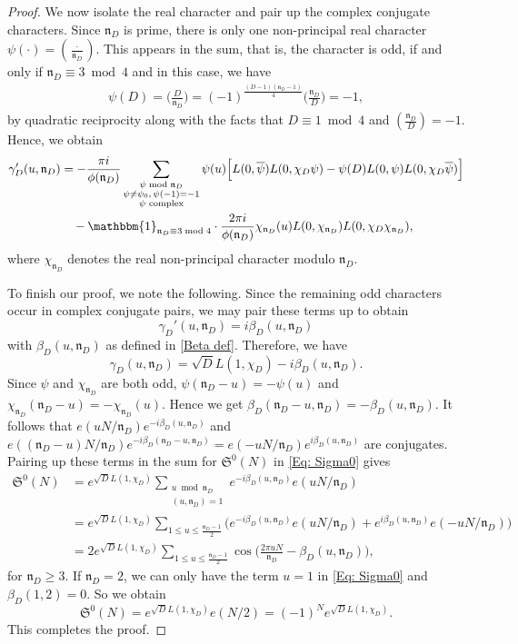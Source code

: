 \documentclass[11pt]{amsart}
\numberwithin{equation}{section}
\newcommand{\mf}{\mathfrak}
\newcommand{\n}{\mf{n}_D}
\theoremstyle{remark}
\begin{document}
\begin{proof}
We now isolate the real character and pair up the complex conjugate characters. Since $\n$ is prime, there is only one non-principal real character $\psi(\cdot)=(\tfrac{\cdot}{\n})$. This appears in the sum, that is, the character is odd, if and only if $\n\equiv 3 \bmod 4$ and in this case, we have 
\begin{align}\label{Eq: Quadratic Reciprocity}
   \psi(D)=\Big(\frac{D}{\n}\Big)=(-1)^{\frac{(D-1)(\n-1)}{4}}\Big(\frac{\n}{D}\Big)
=
-1, 
\end{align}
by quadratic reciprocity along with the facts that $D\equiv 1\bmod 4$ and $(\frac{\n}{D})=-1$. Hence, we obtain 
\begin{align}\label{Eq: Gamma Evaluation III}
\gamma_D'(u,\mf{n}_D)& =
-\frac{\pi i}{\phi(\mf{n}_D)}\sum_{\substack{\psi \bmod \mf{n}_D \\ \psi \neq \psi_0, \,  \psi(-1)=-1 \\ \psi \textrm{ complex}}} \psi(u) \Big[
L(0,\overline{\psi})L(0,\chi_D\psi)-\psi(D) L(0,\psi)L(0,\chi_D\overline{\psi})\Big] \notag \\
&\quad -\mathbbm{1}_{\n \equiv 3\bmod 4} \cdot \frac{2\pi i}{\phi(\mf{n}_D)}\chi_{\n}(u) L(0,\chi_{\n})L(0,\chi_D\chi_{\n}),
\end{align}
where $\chi_{\n}$ denotes the real non-principal character modulo $\n$. 

To finish our proof, we note the following. Since the remaining odd characters occur in complex conjugate pairs, we may pair these terms up to obtain
\[
\gamma_D'(u,\mf{n}_D) = i \beta_D(u,\mf{n}_D)
\]
with $\beta_D(u,\mf{n}_D)$ as defined in \eqref{Beta def}. Therefore, we have 
\[
\gamma_D(u,\mf{n}_D)
=
\sqrt{D}
L(1,\chi_D)
-i \beta_D(u,\mf{n}_D).
\]
Since $\psi$ and $\chi_{\n}$ are both odd, $\psi(\n-u)=-\psi(u)$ and $\chi_{\n}(\n-u) = -\chi_{\n}(u)$. Hence we get $
\beta_D(\n-u,\mf{n}_D)=-\beta_D(u,\mf{n}_D).$ It follows that $e(uN/\n)e^{-i \beta_D(u,\mf{n}_D)}$ and $e((\n-u)N/\n)e^{-i\beta_D(\n-u,\mf{n}_D)}=e(-uN/\n)e^{i\beta_D(u,\mf{n}_D)}$ are conjugates. Pairing up these terms in the sum for $\mf{S}^{0}(N)$ in \eqref{Eq: Sigma0} gives
\begin{align*}
\mf{S}^{0}(N)&=  e^{\sqrt{D}L(1,\chi_D)} \sum_{\substack{u \bmod \mf{n}_D \\ (u,\mf{n}_D)=1}}{e^{-i\beta_{D}(u,\mf{n}_D)}e(uN/\mf{n}_D)} \\
& =e^{\sqrt{D}L(1,\chi_D)} \sum_{1\leq u\leq \tfrac{\n-1}{2}} \bigg( {e^{-i\beta_{D}(u,\mf{n}_D)}e(uN/\mf{n}_D)}+{e^{i\beta_{D}(u,\mf{n}_D)}e(-uN/\mf{n}_D)}\bigg) \\
& = 2e^{\sqrt{D}L(1,\chi_D)}\sum_{1\leq u\leq \tfrac{\n-1}{2}}\cos\Big(\frac{2\pi uN}{\n}-\beta_{D}(u,\mf{n}_D)\Big),
\end{align*}
for $\n\geq 3$. If $\n=2$, we can only have the term $u=1$ in \eqref{Eq: Sigma0} and $\beta_D(1,2)=0$. So we obtain 
\[
\mf{S}^{0}(N)=e^{\sqrt{D}L(1,\chi_D)}e(N/2)=(-1)^N e^{\sqrt{D}L(1,\chi_D)}.
\]
This completes the proof.
\end{proof}
\end{document}
